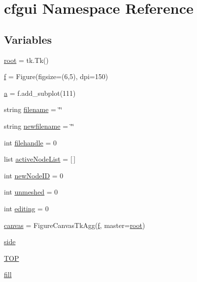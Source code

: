 \hypertarget{namespacecfgui}{}\section{cfgui Namespace Reference}
\label{namespacecfgui}
\subsection*{Variables}
\begin{DoxyCompactItemize}
\item 
\mbox{\hyperlink{namespacecfgui_ad0261b0d3cca8159d011afa3c17bd9f1}{root}} = tk.\+Tk()
\item 
\mbox{\hyperlink{namespacecfgui_a64ae648845422a3c70e06f75eb5fa172}{f}} = Figure(figsize=(6,5), dpi=150)
\item 
\mbox{\hyperlink{namespacecfgui_afa1e0012aec603eb6c61806994452873}{a}} = f.\+add\+\_\+subplot(111)
\item 
string \mbox{\hyperlink{namespacecfgui_ae4078f684c5dfbf537a587c88b087e39}{filename}} = \char`\"{}\char`\"{}
\item 
string \mbox{\hyperlink{namespacecfgui_adacec56309d4b55d655ac53531223503}{newfilename}} = \char`\"{}\char`\"{}
\item 
int \mbox{\hyperlink{namespacecfgui_a4f032350a6dae97371e2e21bcc0223f3}{filehandle}} = 0
\item 
list \mbox{\hyperlink{namespacecfgui_a4d1fd2c1f28a077f91899b4af9665928}{active\+Node\+List}} = \mbox{[}$\,$\mbox{]}
\item 
int \mbox{\hyperlink{namespacecfgui_a69cb956a983205fbd404d059670db416}{new\+Node\+ID}} = 0
\item 
int \mbox{\hyperlink{namespacecfgui_ade4f0d3b0706b49e072673e48b2ac242}{unmeshed}} = 0
\item 
int \mbox{\hyperlink{namespacecfgui_aa3107f0b2f277f51f50bc28f5d93cb7e}{editing}} = 0
\item 
\mbox{\hyperlink{namespacecfgui_aafee5f0725f5961d2bc6696ddac838ce}{canvas}} = Figure\+Canvas\+Tk\+Agg(\mbox{\hyperlink{namespacecfgui_a64ae648845422a3c70e06f75eb5fa172}{f}}, master=\mbox{\hyperlink{namespacecfgui_ad0261b0d3cca8159d011afa3c17bd9f1}{root}})
\item 
\mbox{\hyperlink{namespacecfgui_ae9b6ae360c249a392d4154426dff9609}{side}}
\item 
\mbox{\hyperlink{namespacecfgui_abdd84db69f76172a7b2e574cf726eb24}{T\+OP}}
\item 
\mbox{\hyperlink{namespacecfgui_a86a27e16bd39f4f3228f753b3f04cb91}{fill}}

\end{DoxyCompactItemize}
